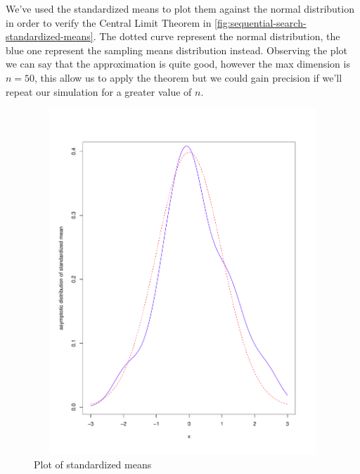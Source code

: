 We've used the standardized means to plot them against the normal
distribution in order to verify the Central Limit Theorem in
\autoref{fig:sequential-search-standardized-means}. The dotted curve
represent the normal distribution, the blue one represent the sampling
means distribution instead. Observing the plot we can say that the
approximation is quite good, however the max dimension is $n=50$, this
allow us to apply the theorem but we could gain precision if we'll
repeat our simulation for a greater value of $n$.
\begin{figure}[htb]
\centering
\includegraphics[height=13cm,width=13cm]{pictures/sequential-search-asymtotic-behaviour-of-standardized-means.pdf}
\caption{Plot of standardized means}
\label{fig:sequential-search-standardized-means}
\end{figure}

